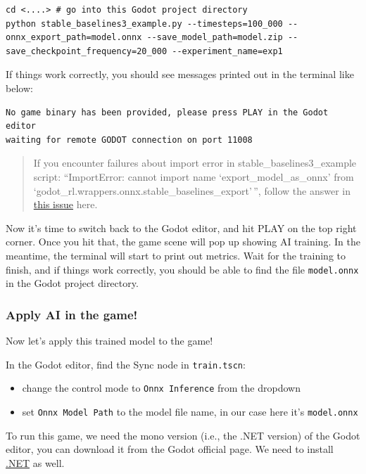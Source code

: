 \documentclass[11pt,a4paper]{article}
\begin{document}
\begin{lstlisting}
cd <....> # go into this Godot project directory
python stable_baselines3_example.py --timesteps=100_000 --onnx_export_path=model.onnx --save_model_path=model.zip --save_checkpoint_frequency=20_000 --experiment_name=exp1
\end{lstlisting}

If things work correctly, you should see messages printed out in the terminal like below:

\begin{lstlisting}
No game binary has been provided, please press PLAY in the Godot editor
waiting for remote GODOT connection on port 11008
\end{lstlisting}

\begin{quote}\raggedright
If you encounter failures about import error in stable\_baselines3\_example script: ``ImportError: cannot import name `export\_model\_as\_onnx' from `godot\_rl.wrappers.onnx.stable\_baselines\_export'\,'', follow the answer in \href{https://github.com/edbeeching/godot_rl_agents/issues/203}{this issue} here.
\end{quote}

Now it's time to switch back to the Godot editor, and hit PLAY on the top right corner. Once you hit that, the game scene will pop up showing AI training. In the meantime, the terminal will start to print out metrics. Wait for the training to finish, and if things work correctly, you should be able to find the file \texttt{model.onnx} in the Godot project directory.

\subsubsection{Apply AI in the game!}\label{apply-ai-in-the-game}

Now let's apply this trained model to the game!

In the Godot editor, find the Sync node in \texttt{train.tscn}:

\begin{itemize}
\item
  change the control mode to \texttt{Onnx\ Inference} from the dropdown
\item
  set \texttt{Onnx\ Model\ Path} to the model file name, in our case here it's \texttt{model.onnx}
\end{itemize}

To run this game, we need the mono version (i.e., the .NET version) of the Godot editor, you can download it from the Godot official page. We need to install \href{https://dotnet.microsoft.com/en-us/download}{.NET} as well.
\end{document}
